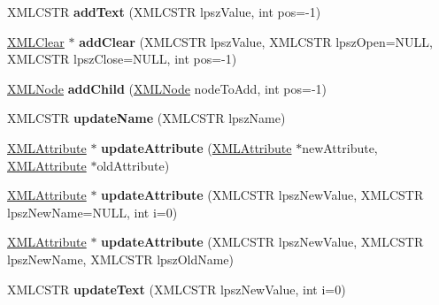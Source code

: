 \begin{DoxyCompactItemize}
\item 
\hypertarget{struct_x_m_l_node_aa4210523be86adbfb39ad52469a9a072}{}\label{struct_x_m_l_node_aa4210523be86adbfb39ad52469a9a072} 
X\+M\+L\+C\+S\+TR {\bfseries add\+Text} (X\+M\+L\+C\+S\+TR lpsz\+Value, int pos=-\/1)
\item 
\hypertarget{struct_x_m_l_node_ad98c759ea686cd8b30314259f942aabf}{}\label{struct_x_m_l_node_ad98c759ea686cd8b30314259f942aabf} 
\hyperlink{struct_x_m_l_clear}{X\+M\+L\+Clear} $\ast$ {\bfseries add\+Clear} (X\+M\+L\+C\+S\+TR lpsz\+Value, X\+M\+L\+C\+S\+TR lpsz\+Open=N\+U\+LL, X\+M\+L\+C\+S\+TR lpsz\+Close=N\+U\+LL, int pos=-\/1)
\item 
\hypertarget{struct_x_m_l_node_adcb76cce8d914425b03fdd9a06ee2a47}{}\label{struct_x_m_l_node_adcb76cce8d914425b03fdd9a06ee2a47} 
\hyperlink{struct_x_m_l_node}{X\+M\+L\+Node} {\bfseries add\+Child} (\hyperlink{struct_x_m_l_node}{X\+M\+L\+Node} node\+To\+Add, int pos=-\/1)
\item 
\hypertarget{struct_x_m_l_node_ae08b643a2b87a77bad3c70eb57ea3043}{}\label{struct_x_m_l_node_ae08b643a2b87a77bad3c70eb57ea3043} 
X\+M\+L\+C\+S\+TR {\bfseries update\+Name} (X\+M\+L\+C\+S\+TR lpsz\+Name)
\item 
\hypertarget{struct_x_m_l_node_adfbd017929a40d6584350e7f3652fcbd}{}\label{struct_x_m_l_node_adfbd017929a40d6584350e7f3652fcbd} 
\hyperlink{struct_x_m_l_attribute}{X\+M\+L\+Attribute} $\ast$ {\bfseries update\+Attribute} (\hyperlink{struct_x_m_l_attribute}{X\+M\+L\+Attribute} $\ast$new\+Attribute, \hyperlink{struct_x_m_l_attribute}{X\+M\+L\+Attribute} $\ast$old\+Attribute)
\item 
\hypertarget{struct_x_m_l_node_a21bdabc3bea95c06b5033a0a0c76afe4}{}\label{struct_x_m_l_node_a21bdabc3bea95c06b5033a0a0c76afe4} 
\hyperlink{struct_x_m_l_attribute}{X\+M\+L\+Attribute} $\ast$ {\bfseries update\+Attribute} (X\+M\+L\+C\+S\+TR lpsz\+New\+Value, X\+M\+L\+C\+S\+TR lpsz\+New\+Name=N\+U\+LL, int i=0)
\item 
\hypertarget{struct_x_m_l_node_ab81bdf55327b63350eaf84835b8cf9b1}{}\label{struct_x_m_l_node_ab81bdf55327b63350eaf84835b8cf9b1} 
\hyperlink{struct_x_m_l_attribute}{X\+M\+L\+Attribute} $\ast$ {\bfseries update\+Attribute} (X\+M\+L\+C\+S\+TR lpsz\+New\+Value, X\+M\+L\+C\+S\+TR lpsz\+New\+Name, X\+M\+L\+C\+S\+TR lpsz\+Old\+Name)
\item 
\hypertarget{struct_x_m_l_node_aad04ffd86ca67253bbc81f941608f8d2}{}\label{struct_x_m_l_node_aad04ffd86ca67253bbc81f941608f8d2} 
X\+M\+L\+C\+S\+TR {\bfseries update\+Text} (X\+M\+L\+C\+S\+TR lpsz\+New\+Value, int i=0)

\end{DoxyCompactItemize}
